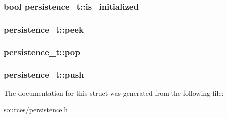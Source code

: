 \subsubsection[{\texorpdfstring{is\+\_\+initialized}{is_initialized}}]{\setlength{\rightskip}{0pt plus 5cm}bool persistence\+\_\+t\+::is\+\_\+initialized}\hypertarget{structpersistence__t_a4cf5a90e3ddbcc0f506700e150ad36b2}{}\label{structpersistence__t_a4cf5a90e3ddbcc0f506700e150ad36b2}
\subsubsection[{\texorpdfstring{peek}{peek}}]{ persistence\+\_\+t\+::peek}\hypertarget{structpersistence__t_acbe305a2910b27cfb7c8b86371803b31}{}\label{structpersistence__t_acbe305a2910b27cfb7c8b86371803b31}
\subsubsection[{\texorpdfstring{pop}{pop}}]{ persistence\+\_\+t\+::pop}\hypertarget{structpersistence__t_a557d32f781ef1250fd881db11d20a80d}{}\label{structpersistence__t_a557d32f781ef1250fd881db11d20a80d}
\subsubsection[{\texorpdfstring{push}{push}}]{ persistence\+\_\+t\+::push}\hypertarget{structpersistence__t_a2758707766bb59cf775f4009d179a742}{}\label{structpersistence__t_a2758707766bb59cf775f4009d179a742}


The documentation for this struct was generated from the following file\+:\begin{DoxyCompactItemize}
\item 
sources/\hyperlink{persistence_8h}{persistence.\+h}\end{DoxyCompactItemize}
